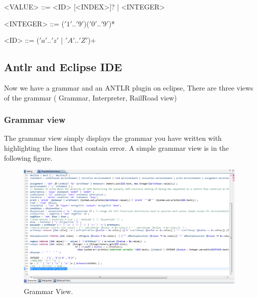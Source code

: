\documentclass[a4paper]{article}
\begin{document}
<VALUE> ::= <ID> [<INDEX>]? | <INTEGER>

$$ $$
 <INTEGER> ::= ($'1'$..$'9'$)($'0'$..$'9'$)* 
 
 $$ $$ 
<ID> ::= ($'a'$..$'z'$ | $'A'$..$'Z'$)+ 

\newpage

\subsection{Antlr and Eclipse IDE}

Now we have a grammar and an ANTLR plugin on eclipse, There are three views of the grammar ( Grammar, Interpreter, RailRoad view) 

\subsubsection{Grammar view}
The grammar view simply displays the grammar you have written with highlighting the lines that contain error.
A simple grammar view is in the following figure.
\newline
\begin{figure}[ht]
\includegraphics[width = \paperwidth]{5.png} 
\caption{Grammar View.}
\end{figure}
\newline
\end{document}
